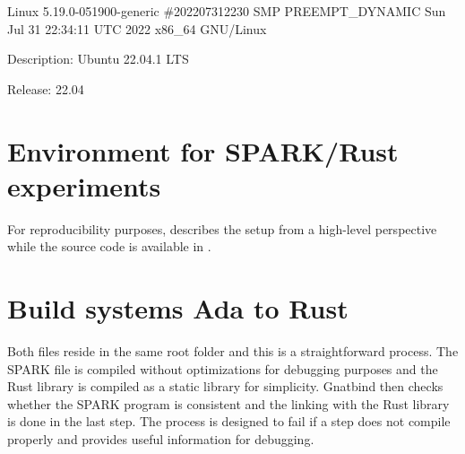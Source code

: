 \documentclass[nomenclature, english, bibtex]{kththesis}
\begin{document}
Linux 5.19.0-051900-generic \#202207312230 SMP PREEMPT\_DYNAMIC Sun Jul 31 22:34:11 UTC 2022 x86\_64 GNU/Linux

Description: Ubuntu 22.04.1 LTS

Release:	22.04

\section[Environment for \& SPARK/Rust experiments]{Environment for SPARK/Rust experiments}

For reproducibility purposes,   describes the setup from a high-level perspective while the source code is available in .

\section{Build systems Ada to Rust}

Both files reside in the same root folder and this is a straightforward process. 
The SPARK file is compiled without optimizations for debugging purposes and the Rust library is compiled as a static library for simplicity. 
Gnatbind then checks whether the SPARK program is consistent and the linking with the Rust library is done in the last step.
The process is designed to fail if a step does not compile properly and provides useful information for debugging.
\end{document}
